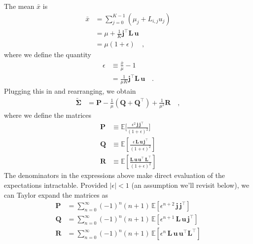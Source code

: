 \documentclass[modern]{aastex62}
\begin{document}
%
The mean $\bar{x}$ is
%
\begin{align}
    \bar{x} & = \sum\limits_{j=0}^{K-1}(\mu_j + L_{i,j}u_j)
    \nonumber                                               \\
            & =
    \mu + \frac{1}{K}\mathbf{j}^\top \mathbf{L} \, \mathbf{u}
    \nonumber                                               \\
            & = \mu(1 + \epsilon)
    \quad,
\end{align}
%
where we define the quantity
%
\begin{align}
    \label{eq:epsilon}
    \epsilon
     & \equiv \frac{\bar{x}}{\mu} - 1
    \nonumber                                                    \\[0.5em]
     & = \frac{1}{\mu K}\mathbf{j}^\top \mathbf{L} \, \mathbf{u}
    \quad.
\end{align}
%
Plugging this in and rearranging, we obtain
%
\begin{align}
    \label{eq:SigmaPQR}
    \tilde{\pmb{\Sigma}}
     & =
    \mathbf{P}
    -
    \frac{1}{\mu}
    \left(
    \mathbf{Q}
    +
    \mathbf{Q}^\top
    \right)
    +
    \frac{1}{\mu^2}
    \mathbf{R}
    \quad,
\end{align}
%
where we define the matrices
%
\begin{align}
    \label{eq:Pexact}
    \mathbf{P} & \equiv
    \mathbb{E}\Big[
        \frac{\epsilon^2 \, \mathbf{j} \, \mathbf{j}^\top}{(1 + \epsilon)^2}
        \Big]
    \\[0.5em]
    \label{eq:Qexact}
    \mathbf{Q} & \equiv
    \mathbb{E}\left[
        \frac{\epsilon\, \mathbf{L} \, \mathbf{u} \, \mathbf{j}^\top}{(1 + \epsilon)^2}
        \right]
    \\[0.5em]
    \label{eq:Rexact}
    \mathbf{R} & \equiv
    \mathbb{E}\left[
        \frac{ \mathbf{L} \, \mathbf{u} \, \mathbf{u}^\top \, \mathbf{L}^\top}{(1 + \epsilon)^2}
        \right]
\end{align}
%
The denominators in the expressions above make direct evaluation of the expectations
intractable. Provided
$\big|\epsilon| < 1$ (an assumption we'll revisit below), we can Taylor expand the matrices as
%
\begin{align}
    \label{eq:WhereItAllGoesWrong1}
    \mathbf{P}
     & =
    \sum\limits_{n=0}^\infty
    (-1)^n (n + 1)
    \,
    \mathbb{E}\left[
        \epsilon^{n + 2}
        \,
        \mathbf{j} \, \mathbf{j}^\top
        \right]
    \\[0.5em]
    \label{eq:WhereItAllGoesWrong2}
    \mathbf{Q}
     & =
    \sum\limits_{n=0}^\infty
    (-1)^n (n + 1)
    \,
    \mathbb{E}\left[
        \epsilon^{n + 1} \,
        \mathbf{L}
        \,
        \mathbf{u}
        \,
        \mathbf{j}^\top
        \right]
    \\[0.5em]
    \label{eq:WhereItAllGoesWrong3}
    \mathbf{R}
     & =
    \sum\limits_{n=0}^\infty
    (-1)^n (n + 1)
    \,
    \mathbb{E}\left[
        \epsilon^n \, \mathbf{L} \, \mathbf{u} \, \mathbf{u}^\top \mathbf{L}^\top
        \right]
\end{align}
\end{document}
